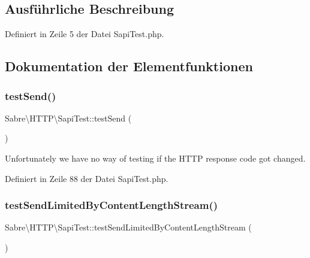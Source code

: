 \subsection{Ausführliche Beschreibung}


Definiert in Zeile 5 der Datei Sapi\+Test.\+php.



\subsection{Dokumentation der Elementfunktionen}
\mbox{\label{class_sabre_1_1_h_t_t_p_1_1_sapi_test_a3093d3e96d4f0fe6683788b235e19c04}} 
\subsubsection{\texorpdfstring{test\+Send()}{testSend()}}
{\footnotesize\ttfamily Sabre\textbackslash{}\+H\+T\+T\+P\textbackslash{}\+Sapi\+Test\+::test\+Send (\begin{DoxyParamCaption}{ }\end{DoxyParamCaption})}

Unfortunately we have no way of testing if the H\+T\+TP response code got changed. 

Definiert in Zeile 88 der Datei Sapi\+Test.\+php.

\mbox{\label{class_sabre_1_1_h_t_t_p_1_1_sapi_test_a670e8a768dcf3e359805e7e05bc31026}} 
\subsubsection{\texorpdfstring{test\+Send\+Limited\+By\+Content\+Length\+Stream()}{testSendLimitedByContentLengthStream()}}
{\footnotesize\ttfamily Sabre\textbackslash{}\+H\+T\+T\+P\textbackslash{}\+Sapi\+Test\+::test\+Send\+Limited\+By\+Content\+Length\+Stream (\begin{DoxyParamCaption}{ }\end{DoxyParamCaption})}

